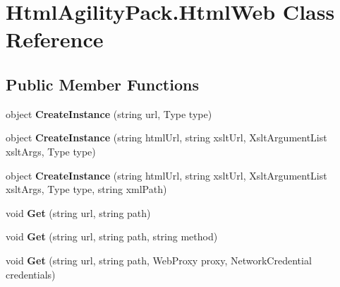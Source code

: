 \hypertarget{class_html_agility_pack_1_1_html_web}{}\section{Html\+Agility\+Pack.\+Html\+Web Class Reference}
\label{class_html_agility_pack_1_1_html_web}
\subsection*{Public Member Functions}
\begin{DoxyCompactItemize}
\item 
\mbox{\label{class_html_agility_pack_1_1_html_web_ad7c151beda99cb79cd7c2e11b0fa0584}} 
object {\bfseries Create\+Instance} (string url, Type type)
\item 
\mbox{\label{class_html_agility_pack_1_1_html_web_ad30fe64e9ea8206065f8cc3c1f3af966}} 
object {\bfseries Create\+Instance} (string html\+Url, string xslt\+Url, Xslt\+Argument\+List xslt\+Args, Type type)
\item 
\mbox{\label{class_html_agility_pack_1_1_html_web_a2ba5b7bceba646788b9e57b102cd63b4}} 
object {\bfseries Create\+Instance} (string html\+Url, string xslt\+Url, Xslt\+Argument\+List xslt\+Args, Type type, string xml\+Path)
\item 
\mbox{\label{class_html_agility_pack_1_1_html_web_a358f22d674ef5560cde6df0b03ec9cf8}} 
void {\bfseries Get} (string url, string path)
\item 
\mbox{\label{class_html_agility_pack_1_1_html_web_a93c860c18604bdb0cec2d8274d6e772b}} 
void {\bfseries Get} (string url, string path, string method)
\item 
\mbox{\label{class_html_agility_pack_1_1_html_web_a51b3f56c7cb520216e3a66a13898d05a}} 
void {\bfseries Get} (string url, string path, Web\+Proxy proxy, Network\+Credential credentials)
\item 
\mbox{\label{class_html_agility_pack_1_1_html_web_aed2024c76f4fcf832333e082e30558bc}} 

\end{DoxyCompactItemize}
